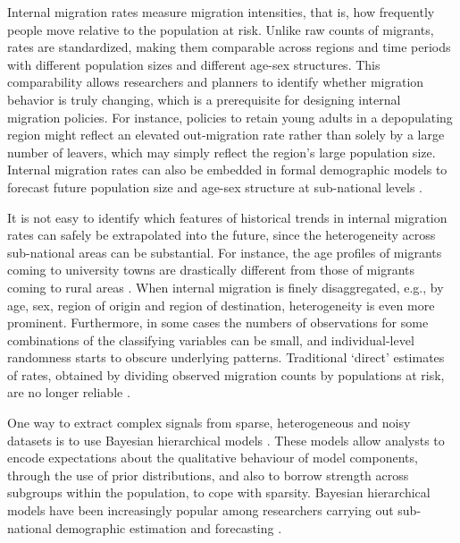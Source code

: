 \documentclass{article}
\begin{document}
Internal migration rates measure migration intensities, that is, how frequently people move relative to the population at risk. Unlike raw counts of migrants, rates are standardized, making them comparable across regions and time periods with different population sizes and different age-sex structures. This comparability allows researchers and planners to identify whether migration behavior is truly changing, which is a prerequisite for designing internal migration policies. For instance, policies to retain young adults in a depopulating region might reflect an elevated out‑migration rate rather than solely by a large number of leavers, which may simply reflect the region's large population size. Internal migration rates can also be embedded in formal demographic models to forecast future population size and age-sex structure at sub-national levels \citep[e.g.][]{willekens1978spatial}.

It is not easy to identify which features of historical trends in internal migration rates can safely be extrapolated into the future, since the heterogeneity across sub-national areas can be substantial. For instance, the age profiles of migrants coming to university towns are drastically different from those of migrants coming to rural areas \citep{wilson2010model}. When internal migration is finely disaggregated, e.g., by age, sex, region of origin and region of destination, heterogeneity is even more prominent. Furthermore, in some cases the numbers of observations for some combinations of the classifying variables can be small, and individual-level randomness starts to obscure underlying patterns. Traditional `direct' estimates of rates, obtained by dividing observed migration counts by populations at risk, are no longer reliable \citep{zhang2020bayesian}.

One way to extract complex signals from {\color{yellow}sparse,} {\color{magenta}heterogeneous and} noisy datasets is to use Bayesian hierarchical models \citep{Gelman2014bayesian}. These models allow analysts to encode expectations about the qualitative behaviour of model components, through the use of prior distributions, and also to borrow strength across subgroups within the population{\color{yellow}, to cope with sparsity}. Bayesian hierarchical models have been increasingly popular among researchers carrying out sub-national demographic estimation and forecasting \citep{lynch2010obtaining,schmertmann2013bayes,bijak2016bayesian,alexander2017flexible,bryant2018bayesian,wang2022spatiotemporal,alexander2022bayesian,dharamshi2025jointly,omenti2026bayesian}. 
\end{document}
